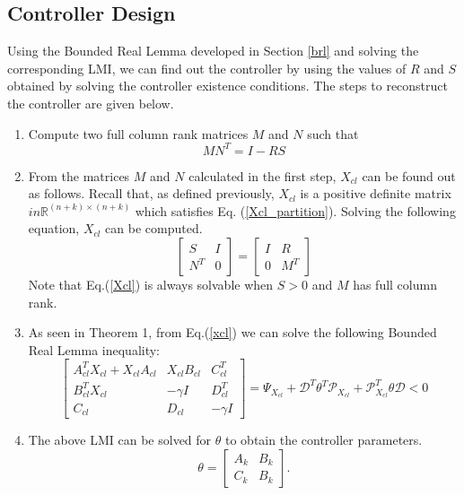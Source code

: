 \documentclass[a4paper,12pt]{article}
\begin{document}
	 \subsection{Controller Design}
	 Using the Bounded Real Lemma developed in Section \ref{brl} and solving the corresponding LMI, we can find out the controller by using the values of $R$ and $S$ obtained by solving the controller existence conditions. The steps to reconstruct the controller are given below.
	 \begin{enumerate}
	 \item Compute two full column rank matrices $M$ and $N$ such that
	 \begin{equation}
	 MN^{T} = I - RS
	 \end{equation}
	 \item From the matrices $M$ and $N$ calculated in the first step, $X_{cl}$ can be found out as follows. Recall that, as defined previously, $X_{cl}$ is a positive definite matrix $in \mathbb{R}^{(n+k) \times (n+k)}$ which satisfies Eq. (\ref{Xcl_partition}). Solving the following equation, $X_{cl}$ can be computed.
	 \begin{equation}
	 \begin{bmatrix}
	 S & I \\ N^{T} & 0
	 \end{bmatrix}
	 =
	 \begin{bmatrix}
	 I & R \\
	 0 & M^{T}
	 \end{bmatrix}
	 \label{Xcl}
	 \end{equation}
	 Note that Eq.(\ref{Xcl}) is always solvable when $S>0$ and $M$ has full column rank. 
	\item As seen in Theorem 1, from Eq.(\ref{xcl}) we can solve the following Bounded Real Lemma inequality:
	\begin{equation}
		\begin{bmatrix}
			A_{cl}^{T}X_{cl}+X_{cl}A_{cl} & X_{cl}B_{cl} & C_{cl}^{T} \\
			B_{cl}^{T}X_{cl} & -\gamma I & D_{cl}^{T} \\
			C_{cl} & D_{cl} & -\gamma I
		\end{bmatrix}
		=\Psi_{X_{cl}} + \mathscr{D}^{T}\theta^{T}\mathscr{P}_{X_{cl}}+\mathscr{P}_{X_{cl}}^{T}\theta\mathscr{D} <0
		\end{equation}
	\item The above LMI can be solved for $\theta$ to obtain the controller parameters. 
	\begin{equation}
	\theta = \begin{bmatrix}
	A_{k} & B_{k} \\
	C_{k} & B_{k}
	\end{bmatrix}.
	\end{equation}
	 \end{enumerate}
\end{document}
